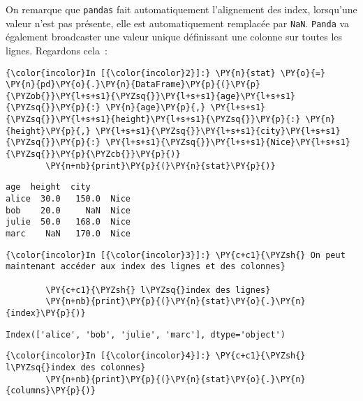     On remarque que \texttt{pandas} fait automatiquement l'alignement des
index, lorsqu'une valeur n'est pas présente, elle est automatiquement
remplacée par \texttt{NaN}. \texttt{Panda} va également broadcaster une
valeur unique définissant une colonne sur toutes les lignes. Regardons
cela~:

    \begin{Verbatim}[commandchars=\\\{\},frame=single,framerule=0.3mm,rulecolor=\color{cellframecolor}]
{\color{incolor}In [{\color{incolor}2}]:} \PY{n}{stat} \PY{o}{=} \PY{n}{pd}\PY{o}{.}\PY{n}{DataFrame}\PY{p}{(}\PY{p}{\PYZob{}}\PY{l+s+s1}{\PYZsq{}}\PY{l+s+s1}{age}\PY{l+s+s1}{\PYZsq{}}\PY{p}{:} \PY{n}{age}\PY{p}{,} \PY{l+s+s1}{\PYZsq{}}\PY{l+s+s1}{height}\PY{l+s+s1}{\PYZsq{}}\PY{p}{:} \PY{n}{height}\PY{p}{,} \PY{l+s+s1}{\PYZsq{}}\PY{l+s+s1}{city}\PY{l+s+s1}{\PYZsq{}}\PY{p}{:} \PY{l+s+s1}{\PYZsq{}}\PY{l+s+s1}{Nice}\PY{l+s+s1}{\PYZsq{}}\PY{p}{\PYZcb{}}\PY{p}{)}
        \PY{n+nb}{print}\PY{p}{(}\PY{n}{stat}\PY{p}{)}
\end{Verbatim}


    \begin{Verbatim}[commandchars=\\\{\},frame=single,framerule=0.3mm,rulecolor=\color{cellframecolor}]
        age  height  city
alice  30.0   150.0  Nice
bob    20.0     NaN  Nice
julie  50.0   168.0  Nice
marc    NaN   170.0  Nice
\end{Verbatim}

    \begin{Verbatim}[commandchars=\\\{\},frame=single,framerule=0.3mm,rulecolor=\color{cellframecolor}]
{\color{incolor}In [{\color{incolor}3}]:} \PY{c+c1}{\PYZsh{} On peut maintenant accéder aux index des lignes et des colonnes}
        
        \PY{c+c1}{\PYZsh{} l\PYZsq{}index des lignes}
        \PY{n+nb}{print}\PY{p}{(}\PY{n}{stat}\PY{o}{.}\PY{n}{index}\PY{p}{)}
\end{Verbatim}


    \begin{Verbatim}[commandchars=\\\{\},frame=single,framerule=0.3mm,rulecolor=\color{cellframecolor}]
Index(['alice', 'bob', 'julie', 'marc'], dtype='object')
\end{Verbatim}

    \begin{Verbatim}[commandchars=\\\{\},frame=single,framerule=0.3mm,rulecolor=\color{cellframecolor}]
{\color{incolor}In [{\color{incolor}4}]:} \PY{c+c1}{\PYZsh{} l\PYZsq{}index des colonnes}
        \PY{n+nb}{print}\PY{p}{(}\PY{n}{stat}\PY{o}{.}\PY{n}{columns}\PY{p}{)}
\end{Verbatim}


